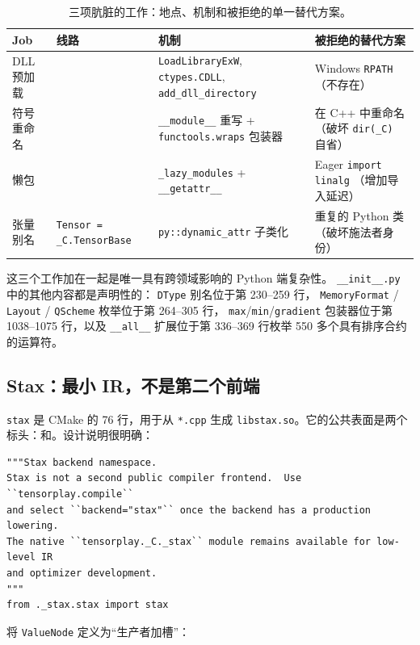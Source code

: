 \begin{table}[H]
\centering
\caption{三项肮脏的工作：地点、机制和被拒绝的单一替代方案。}
\label{tab:threedirty}
\small
\begin{tabular}{p{2.0cm}p{3.2cm}p{3.6cm}p{3.4cm}}
\toprule
Job & 线路 & 机制 & 被拒绝的替代方案 \\
\midrule
DLL预加载 &  & \texttt{LoadLibraryExW}, \texttt{ctypes.CDLL}, \texttt{add\_dll\_directory} & Windows \texttt{RPATH}（不存在） \\
符号重命名 &  & \texttt{\_\_module\_\_} 重写 + \texttt{functools.wraps} 包装器 & 在 C++ 中重命名（破坏 \texttt{dir(\_C)} 自省） \\
懒包 &  & \texttt{\_lazy\_modules} + \texttt{\_\_getattr\_\_} & Eager \texttt{import linalg} （增加导入延迟） \\
张量别名 & \texttt{Tensor = \_C.TensorBase} & \texttt{py::dynamic\_attr} 子类化 & 重复的 Python 类（破坏施法者身份） \\
\bottomrule
\end{tabular}
\end{table}

这三个工作加在一起是唯一具有跨领域影响的 Python 端复杂性。 \texttt{\_\_init\_\_.py} 中的其他内容都是声明性的： \texttt{DType} 别名位于第 230--259 行， \texttt{MemoryFormat} / \texttt{Layout} / \texttt{QScheme} 枚举位于第 264--305 行， \texttt{max}/\texttt{min}/\texttt{gradient} 包装器位于第 1038--1075 行，以及 \texttt{\_\_all\_\_} 扩展位于第 336--369 行枚举 550 多个具有排序合约的运算符。

\subsection{Stax：最小 IR，不是第二个前端}
\label{sec:arch:stax}

\texttt{stax} 是 CMake 的 76 行，用于从 \texttt{*.cpp} 生成 \texttt{libstax.so}。它的公共表面是两个标头：和。设计说明很明确：

\begin{lstlisting}[caption={not a second frontend.}, label=lst:staxpy]
"""Stax backend namespace.
Stax is not a second public compiler frontend.  Use ``tensorplay.compile``
and select ``backend="stax"`` once the backend has a production lowering.
The native ``tensorplay._C._stax`` module remains available for low-level IR
and optimizer development.
"""
from ._stax.stax import stax
\end{lstlisting}

将 \texttt{ValueNode} 定义为“生产者加槽”：

